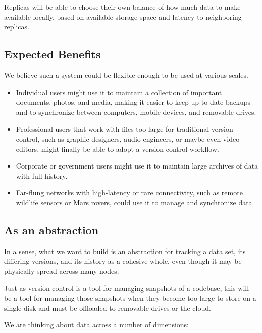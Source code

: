 \documentclass[a4paper]{article}
\begin{document}
Replicas will be able to choose their own balance of how much data to make
available locally, based on available storage space and latency to neighboring
replicas.

\subsection{Expected Benefits}

We believe such a system could be flexible enough to be used at various scales.

\begin{itemize}

  \item Individual users might use it to maintain a collection of important
    documents, photos, and media, making it easier to keep up-to-date backups
    and to synchronize between computers, mobile devices, and removable drives.

  \item Professional users that work with files too large for traditional
    version control, such as graphic designers, audio engineers, or maybe even
    video editors, might finally be able to adopt a version-control workflow.

  \item Corporate or government users might use it to maintain large archives of
    data with full history.

  \item Far-flung networks with high-latency or rare connectivity, such as
    remote wildlife sensors or Mars rovers, could use it to manage and
    synchronize data.

\end{itemize}


\subsection{As an abstraction}

In a sense, what we want to build is an abstraction for tracking a data set, its
differing versions, and its history as a cohesive whole, even though it may be
physically spread across many nodes.

Just as version control is a tool for managing snapshots of a codebase, this
will be a tool for managing those snapshots when they become too large to store
on a single disk and must be offloaded to removable drives or the cloud.

We are thinking about data across a number of dimensions:
\end{document}
